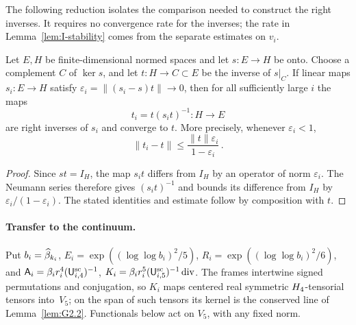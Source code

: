 The following reduction isolates the comparison needed to construct the right inverses. It requires no convergence rate for the inverses; the rate in Lemma~\ref{lem:I-stability} comes from the separate estimates on $v_i$.
\begin{lemma}\label{lem:I-complement}
Let $E,H$ be finite-dimensional normed spaces and let $s:E\to H$ be onto. Choose a complement $C$ of $\ker s$, and let $t:H\to C\subset E$ be the inverse of $s|_C$. If linear maps $s_i:E\to H$ satisfy $\varepsilon_i=\|(s_i-s)t\|\to0$, then for all sufficiently large $i$ the maps
\begin{equation*}
t_i=t(s_it)^{-1}:H\longrightarrow E
\end{equation*}
are right inverses of $s_i$ and converge to $t$. More precisely, whenever $\varepsilon_i<1$,
\begin{equation*}
\|t_i-t\|\le\frac{\|t\|\varepsilon_i}{1-\varepsilon_i}\,.
\end{equation*}
\end{lemma}
\begin{proof}
Since $st=I_H$, the map $s_it$ differs from $I_H$ by an operator of norm $\varepsilon_i$. The Neumann series therefore gives $(s_it)^{-1}$ and bounds its difference from $I_H$ by $\varepsilon_i/(1-\varepsilon_i)$. The stated identities and estimate follow by composition with $t$.
\end{proof}

\paragraph{Transfer to the continuum.}
Put $b_i=\widehat{\beta}_{k_i}$, $E_i=\exp((\log\log b_i)^2/5)$, $R_i=\exp((\log\log b_i)^2/6)$, and $\mathsf A_i=\beta_ir_i^4(\mathsf{U}_{i,4}^{\mathrm{sc}})^{-1}$, $K_i=\beta_ir_i^5(\mathsf{U}_{i,5}^{\mathrm{sc}})^{-1}\operatorname{div}$. The frames intertwine signed permutations and conjugation, so $K_i$ maps centered real symmetric $H_4$-tensorial tensors into~$V_5$; on the span of such tensors its kernel is the conserved line of Lemma~\ref{lem:G2.2}. Functionals below act on $V_5$, with any fixed norm.

